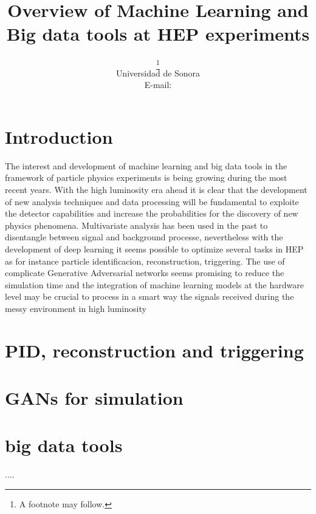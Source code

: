 \documentclass{PoS}
\title{Overview of Machine Learning and Big data tools at HEP experiments}
\author{\speaker{A. Castaneda}\thanks{A footnote may follow.}\\
        Universidad de Sonora\\
        E-mail: \email{castaned@cern.ch}}
\begin{document}
\section{Introduction}


The interest and development of machine learning and big data tools in the framework of particle physics experiments
is being growing during the most recent years. With the high luminosity era ahead it is clear that the development of new
analysis techniques and data processing will be fundamental to exploite the detector capabilities and increase the probabilities
for the discovery of new physics phenomena. Multivariate analysis  has been used in the past to disentangle between signal and
background processe, nevertheless with the development of deep learning it seems possible to optimize several tasks in HEP as for instance
particle identificacion, reconstruction, triggering.   The use of complicate Generative Adversarial networks seems promising to
reduce the simulation time and the integration of machine learning models at the hardware level may be crucial to process in a smart
way the signals received during the messy environment in high luminosity 


\section{PID, reconstruction and triggering}

\section{GANs for simulation}

\section{big data tools}

\begin{thebibliography}{99}
....

\end{thebibliography}
\end{document}
